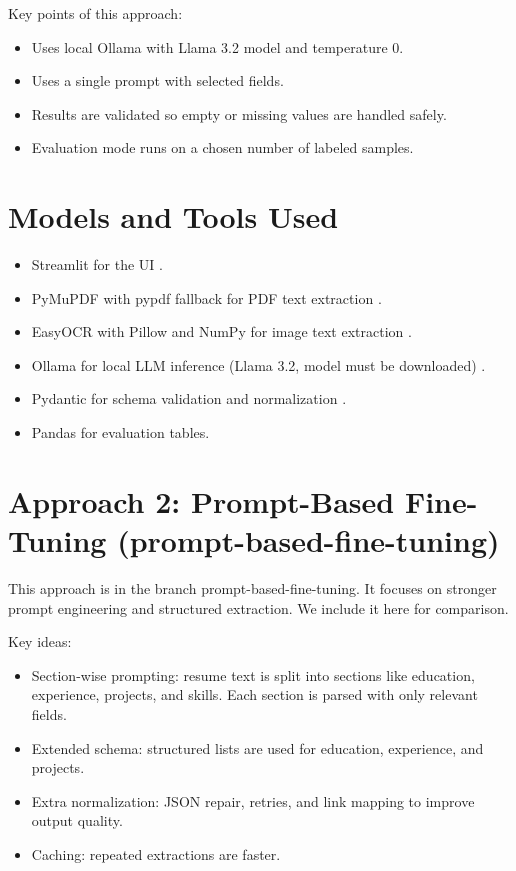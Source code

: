 \documentclass[11pt,a4paper]{article}
\begin{document}
Key points of this approach:
\begin{itemize}
\item Uses local Ollama with Llama 3.2 model and temperature 0.
\item Uses a single prompt with selected fields.
\item Results are validated so empty or missing values are handled safely.
\item Evaluation mode runs on a chosen number of labeled samples.
\end{itemize}

\section{Models and Tools Used}
\begin{itemize}
\item Streamlit for the UI \cite{streamlit}.
\item PyMuPDF with pypdf fallback for PDF text extraction \cite{pymupdf}.
\item EasyOCR with Pillow and NumPy for image text extraction \cite{easyocr}.
\item Ollama for local LLM inference (Llama 3.2, model must be downloaded) \cite{ollama,llama32}.
\item Pydantic for schema validation and normalization \cite{pydantic}.
\item Pandas for evaluation tables.
\end{itemize}

\section{Approach 2: Prompt-Based Fine-Tuning (prompt-based-fine-tuning)}
This approach is in the branch prompt-based-fine-tuning. It focuses on stronger prompt engineering and structured extraction. We include it here for comparison.

Key ideas:
\begin{itemize}
\item Section-wise prompting: resume text is split into sections like education, experience, projects, and skills. Each section is parsed with only relevant fields.
\item Extended schema: structured lists are used for education, experience, and projects.
\item Extra normalization: JSON repair, retries, and link mapping to improve output quality.
\item Caching: repeated extractions are faster.
\end{itemize}
\end{document}
